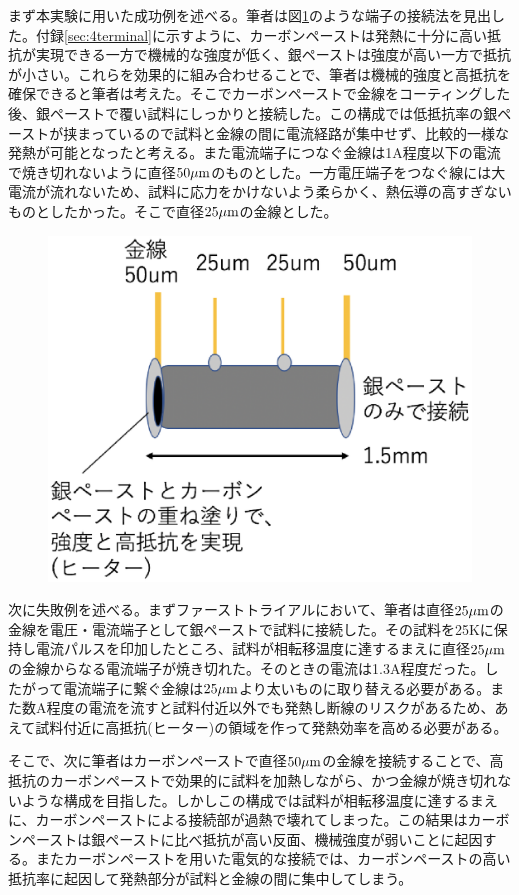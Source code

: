 まず本実験に用いた成功例を述べる。筆者は図\ref{fig:schematics_sample}のような端子の接続法を見出した。付録\ref{sec:4terminal}に示すように、カーボンペーストは発熱に十分に高い抵抗が実現できる一方で機械的な強度が低く、銀ペーストは強度が高い一方で抵抗が小さい。これらを効果的に組み合わせることで、筆者は機械的強度と高抵抗を確保できると筆者は考えた。そこでカーボンペーストで金線をコーティングした後、銀ペーストで覆い試料にしっかりと接続した。この構成では低抵抗率の銀ペーストが挟まっているので試料と金線の間に電流経路が集中せず、比較的一様な発熱が可能となったと考える。また電流端子につなぐ金線は1A程度以下の電流で焼き切れないように直径$\rm 50 \mu m$のものとした。一方電圧端子をつなぐ線には大電流が流れないため、試料に応力をかけないよう柔らかく、熱伝導の高すぎないものとしたかった。そこで直径$\rm 25 \mu m$の金線とした。
\begin{figure}[!h]
    \begin{center}
   \includegraphics[width=0.4\hsize]{experiment/schematics_sample.eps}
  \end{center}
  \caption{}
  \label{fig:schematics_sample}
\end{figure}

次に失敗例を述べる。まずファーストトライアルにおいて、筆者は直径$\rm 25 \mu m$の金線を電圧・電流端子として銀ペーストで試料に接続した。その試料を25Kに保持し電流パルスを印加したところ、試料が相転移温度に達するまえに直径$\rm 25 \mu m$の金線からなる電流端子が焼き切れた。そのときの電流は1.3A程度だった。したがって電流端子に繋ぐ金線は$\rm 25 \mu m$より太いものに取り替える必要がある。また数A程度の電流を流すと試料付近以外でも発熱し断線のリスクがあるため、あえて試料付近に高抵抗(ヒーター)の領域を作って発熱効率を高める必要がある。

そこで、次に筆者はカーボンペーストで直径$\rm 50 \mu m$の金線を接続することで、高抵抗のカーボンペーストで効果的に試料を加熱しながら、かつ金線が焼き切れないような構成を目指した。しかしこの構成では試料が相転移温度に達するまえに、カーボンペーストによる接続部が過熱で壊れてしまった。この結果はカーボンペーストは銀ペーストに比べ抵抗が高い反面、機械強度が弱いことに起因する。またカーボンペーストを用いた電気的な接続では、カーボンペーストの高い抵抗率に起因して発熱部分が試料と金線の間に集中してしまう。

